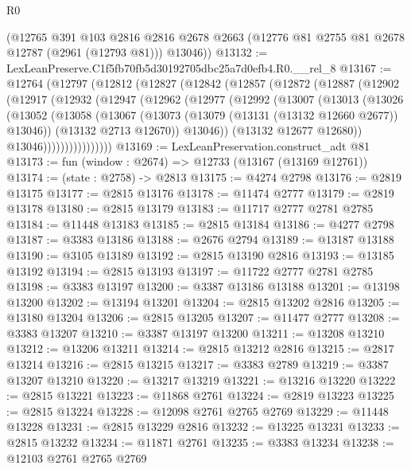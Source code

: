 \begin{lexlean}{R0}
\begin{coremodule}
      (@12765
        @391
        @103
        @2816
        @2816
        @2678
        @2663
        (@12776 @81 @2755 @81 @2678 @12787 (@2961 (@12793 @81)))
        @13046))
@13132 := LexLeanPreserve.C1f5fb70fb5d30192705dbc25a7d0efb4.R0.__rel_8
@13167 := @12764
    (@12797
      (@12812
        (@12827
          (@12842
            (@12857
              (@12872
                (@12887
                  (@12902
                    (@12917
                      (@12932
                        (@12947
                          (@12962
                            (@12977
                              (@12992
                                (@13007
                                  (@13013
                                    (@13026
                                      (@13052
                                        (@13058
                                          (@13067
                                            (@13073 (@13079 (@13131 (@13132 @12660 @2677)) @13046))
                                            (@13132 @2713 @12670))
                                          @13046))
                                      (@13132 @12677 @12680))
                                    @13046))))))))))))))))
@13169 := LexLeanPreservation.construct_adt @81
@13173 := fun (window : @2674) => @12733 (@13167 (@13169 @12761))
@13174 := (state : @2758) -> @2813
@13175 := @4274 @2798
@13176 := @2819 @13175
@13177 := @2815 @13176
@13178 := @11474 @2777
@13179 := @2819 @13178
@13180 := @2815 @13179
@13183 := @11717 @2777 @2781 @2785
@13184 := @11448 @13183
@13185 := @2815 @13184
@13186 := @4277 @2798
@13187 := @3383 @13186
@13188 := @2676 @2794
@13189 := @13187 @13188
@13190 := @3105 @13189
@13192 := @2815 @13190 @2816
@13193 := @13185 @13192
@13194 := @2815 @13193
@13197 := @11722 @2777 @2781 @2785
@13198 := @3383 @13197
@13200 := @3387 @13186 @13188
@13201 := @13198 @13200
@13202 := @13194 @13201
@13204 := @2815 @13202 @2816
@13205 := @13180 @13204
@13206 := @2815 @13205
@13207 := @11477 @2777
@13208 := @3383 @13207
@13210 := @3387 @13197 @13200
@13211 := @13208 @13210
@13212 := @13206 @13211
@13214 := @2815 @13212 @2816
@13215 := @2817 @13214
@13216 := @2815 @13215
@13217 := @3383 @2789
@13219 := @3387 @13207 @13210
@13220 := @13217 @13219
@13221 := @13216 @13220
@13222 := @2815 @13221
@13223 := @11868 @2761
@13224 := @2819 @13223
@13225 := @2815 @13224
@13228 := @12098 @2761 @2765 @2769
@13229 := @11448 @13228
@13231 := @2815 @13229 @2816
@13232 := @13225 @13231
@13233 := @2815 @13232
@13234 := @11871 @2761
@13235 := @3383 @13234
@13238 := @12103 @2761 @2765 @2769

\end{coremodule}
\end{lexlean}
